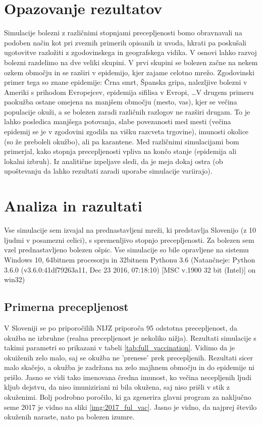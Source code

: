 \documentclass[a4paper, 11pt]{article}
\begin{document}
\section*{Opazovanje rezultatov}
Simulacije bolezni z različnimi stopnjami precepljenosti bomo obravnavali na podoben način kot pri zveznih primerih opisanih iz uvoda, hkrati pa poskušali ugotovitve razložiti z zgodovinskega in geografskega vidika. V osnovi lahko razvoj bolezni razdelimo na dve veliki skupini. V prvi skupini se bolezen začne na nekem ozkem območju in se razširi v epidemijo, kjer zajame celotno mrežo. Zgodovinski primer tega so znane epidemije: Črna smrt, Španska gripa, nalezljive bolezni v Ameriki s prihodom Evropejcev, epidemija sifilisa v Evropi, \dots V drugem primeru paokužba ostane omejena na manjšem območju (mesto, vas), kjer se večina populacije okuži, a se bolezen zaradi različnih razlogov ne razširi drugam. To je lahko posledica manjšega potovanja, slabe povezanosti med mesti (večina epidemij se je v zgodovini zgodila na višku razcveta trgovine), imunosti okolice (so že preboleli okužbo), ali pa karantene. Med različnimi simulacijami bom primerjal, kako stopnja precepljenosti vpliva na končo stanje (epidemija ali lokalni izbruh). Iz analitične izpeljave sledi, da je meja dokaj ostra (ob upoštevanju da lahko rezultati zaradi uporabe simulacije variirajo).

\section*{Analiza in razultati}
Vse simulacije sem izvajal na prednastavljeni mreži, ki predstavlja Slovenijo (z 10 ljudmi v posamezni celici), s spremenljivo stopnjo precepljenosti. Za bolezen sem vzel prednastavljeno bolezen ošpic. Vse simulacije so bile opravljene na sistemu Windows 10, 64bitnem procesorju in 32bitnem Pythonu 3.6 (Natančneje: Python 3.6.0 (v3.6.0:41df79263a11, Dec 23 2016, 07:18:10) [MSC v.1900 32 bit (Intel)] on win32)

\subsection*{Primerna precepljenost}
V Sloveniji se po priporočilih NIJZ priporoča 95 odstotna precepljenost, da okužba ne izbruhne (realna precepljenost je nekoliko nižja). Rezultati simulacije s takimi parametri so prikazani v tabeli \ref{tab:full_vaccination}. Vidimo da je okuiženih zelo malo, saj se okužba ne 'prenese' prek precepljenih. Rezultati sicer malo skačejo, a okužba je zadržana na zelo majhnem območju in do epidemije ni prišlo. Jasno se vidi tako imenovana čredna imunost, ko večina necepljenih ljudi kljub dejstvu, da niso imuniziriani ni bila okužena, saj niso prišli v stik z okuženimi. Bolj podrobno poročilo, ki ga zgenerira glavni program za naključno seme 2017 je vidno na sliki \ref{img:2017_ful_vac}. Jasno je vidno, da najprej število okuženih naraste, nato pa bolezen izumre.
\end{document}
